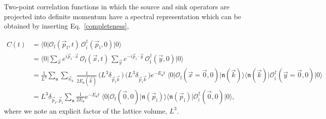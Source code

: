 Two-point correlation functions in which the source and sink operators are projected into definite momentum have a spectral representation which can be obtained by inserting Eq.~\ref{completeness},

\begin{align*}
C(t) 	&= \big\langle 0 \big| \mathcal{O}^{\,}_\mathrm{f}(\vec{p}_{\mathrm{f}}, t) \, \mathcal{O}^\dag_\mathrm{i}(\vec{p}_\mathrm{i}, 0) \big| 0 \big\rangle \\ 
		&= \big\langle 0 \big| \sum\nolimits_{\vec{x}} e^{i \vec{p}_\mathrm{f}\cdot \vec{x} }\,  \mathcal{O}^{\,}_\mathrm{f}(\vec{x}, t)\, 
		\sum\nolimits_{\vec{y}} e^{-i \vec{p}_\mathrm{i}\cdot \vec{y} }\,  \mathcal{O}^{\dag}_\mathrm{i}(\vec{y}, 0) \big| 0 \big\rangle \\
		&= \frac{1}{L^3} \sum_\mathfrak{n} \sum_{\vec{n}_k} \, \frac{1}{2 E_\mathfrak{n}(\vec{k}) } 
		\,\big( L^3 \delta_{\vec{p}_\mathrm{f} \vec{k}} \,\big)
		\,\big( L^3 \delta_{\vec{p}_\mathrm{i} \vec{k}} \,\big) 
		e^{-E_{\mathfrak{n}} t} \; 
		\big\langle 0 \big| \mathcal{O}_\mathrm{f}(\vec{x}=\vec{0}, 0) \big| \mathfrak{n}(\vec{k}) \big\rangle
		\big\langle \mathfrak{n}(\vec{k}) \big| \mathcal{O}^\dag_\mathrm{i}(\vec{y}=\vec{0}, 0) \big| 0\big\rangle \\
		&= L^3 \delta_{\vec{p}_\mathrm{f} , \vec{p}_\mathfrak{i}} \sum_\mathfrak{n} \frac{1}{2 E_\mathfrak{n} } 
		e^{-E_{\mathfrak{n}} t} \; 
		\big\langle 0 \big| \mathcal{O}_\mathrm{f}(\vec{0}, 0) \big| \mathfrak{n}(\vec{p}_\mathrm{i}) \big\rangle
		\big\langle \mathfrak{n}(\vec{p}_\mathrm{i}) \big| \mathcal{O}^\dag_\mathrm{i}(\vec{0}, 0) \big| 0\big\rangle,
\end{align*}
where we note an explicit factor of the lattice volume, $L^3$. 

